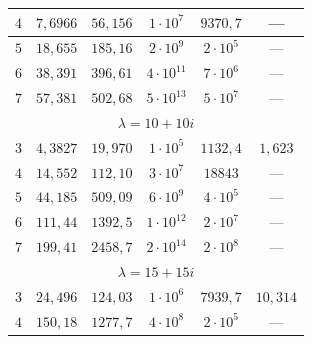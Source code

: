 \begin{table}
\begin{minipage}[t]{.5\textwidth}
\begin{tabular}{c|c|c|c|c|c}
      \hline

      $4$&$7{,}6966$&$56{,}156$&$1\cdot10^7$&$9370{,}7$&---\\

      \hline

      $5$&$18{,}655$&$185{,}16$&$2\cdot10^9$&$2\cdot10^5$&---\\

      \hline

      $6$&$38{,}391$&$396{,}61$&$4\cdot10^{11}$&$7\cdot10^6$&---\\

      \hline

      $7$&$57{,}381$&$502{,}68$&$5\cdot10^{13}$&$5\cdot10^7$&---\\

      \hline

      \multicolumn{6}{c}{$\lambda=10+10i$}\\

      \hline

      $3$&$4{,}3827$&$19{,}970$&$1\cdot10^5$&$1132{,}4$&$1{,}623$\\

      \hline

      $4$&$14{,}552$&$112{,}10$&$3\cdot10^7$&$18843$&---\\

      \hline

      $5$&$44{,}185$&$509{,}09$&$6\cdot10^9$&$4\cdot10^5$&---\\

      \hline

      $6$&$111{,}44$&$1392{,}5$&$1\cdot10^{12}$&$2\cdot10^7$&---\\

      \hline

      $7$&$199{,}41$&$2458{,}7$&$2\cdot10^{14}$&$2\cdot10^8$&---\\

      \hline

      \multicolumn{6}{c}{$\lambda=15+15i$}\\

      \hline

      $3$&$24{,}496$&$124{,}03$&$1\cdot10^6$&$7939{,}7$&$10{,}314$\\

      \hline

      $4$&$150{,}18$&$1277{,}7$&$4\cdot10^8$&$2\cdot10^5$&---\\

      \hline


\end{tabular}
\end{minipage}
\end{table}
